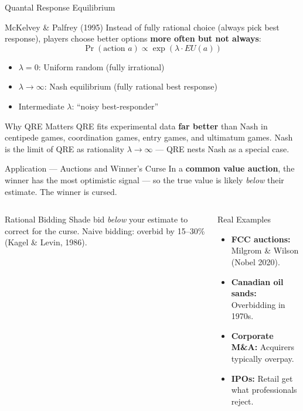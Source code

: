 \documentclass[aspectratio=169]{beamer}
\begin{document}
\begin{frame}{Quantal Response Equilibrium}
\begin{block}{McKelvey \& Palfrey (1995)}
Instead of fully rational choice (always pick best response), players choose better options \textbf{more often but not always}:
\[
  \Pr(\text{action } a) \propto \exp(\lambda \cdot EU(a))
\]
\begin{itemize}\setlength{\itemsep}{0pt}
  \item $\lambda = 0$: Uniform random (fully irrational)
  \item $\lambda \to \infty$: Nash equilibrium (fully rational best response)
  \item Intermediate $\lambda$: ``noisy best-responder''
\end{itemize}
\end{block}
\begin{exampleblock}{Why QRE Matters}
QRE fits experimental data \textbf{far better} than Nash in centipede games, coordination games, entry games, and ultimatum games.
Nash is the limit of QRE as rationality $\lambda \to \infty$ --- QRE nests Nash as a special case.
\end{exampleblock}
\end{frame}

\begin{frame}{Application --- Auctions and Winner's Curse}
In a \textbf{common value auction}, the winner has the most optimistic signal --- so the true value is likely \textit{below} their estimate. The winner is \alert{cursed}.
\begin{columns}
\begin{alertblock}{Rational Bidding}
Shade bid \textit{below} your estimate to correct for the curse. Naive bidding: overbid by 15--30\% (Kagel \& Levin, 1986).
\end{alertblock}
\begin{exampleblock}{Real Examples}
\begin{itemize}\small
  \item \textbf{FCC auctions:} Milgrom \& Wilson (Nobel 2020).
  \item \textbf{Canadian oil sands:} Overbidding in 1970s.
  \item \textbf{Corporate M\&A:} Acquirers typically overpay.
  \item \textbf{IPOs:} Retail get what professionals reject.
\end{itemize}
\end{exampleblock}
\end{columns}
\end{frame}
\end{document}
